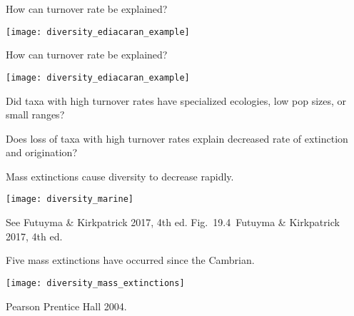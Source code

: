 \documentclass[t]{beamer}
\newcommand{\futuyma}[1]{%
	\ifthenelse{\isempty{#1}}%
	{Futuyma \& Kirkpatrick 2017, 4th ed.}%
	{Fig.~#1~Futuyma \& Kirkpatrick 2017, 4th ed.}%
}
\newcommand{\backskip}{\vspace{-0.5\baselineskip}}
\begin{document}
%
\begin{frame}{How can turnover rate be explained?}

\backskip

\begin{multicols}{2}

\hangpara {}

\hangpara {}

\hangpara {}

\columnbreak

\centering
\noindent\texttt{[image: diversity\_ediacaran\_example]}

\end{multicols}
\end{frame}
%

\begin{frame}{How can turnover rate be explained?}

\backskip

\begin{multicols}{2}

\noindent\texttt{[image: diversity\_ediacaran\_example]}

\columnbreak

Did taxa with high turnover rates have specialized ecologies, low pop sizes, or small ranges?


\bigskip

Does loss of taxa with high turnover rates explain decreased rate of extinction and origination?

\end{multicols}
\end{frame}


\begin{frame}{Mass extinctions cause diversity to decrease rapidly.}

\backskip

\centering

\texttt{[image: diversity\_marine]}
	
\tinyfill See \futuyma{19.4}

\end{frame}



\begin{frame}{Five mass extinctions have occurred since the Cambrian.}

\backskip

\centering

\texttt{[image: diversity\_mass\_extinctions]}
	
\tinyfill \textcopyright Pearson Prentice Hall 2004.

\end{frame}
\end{document}

